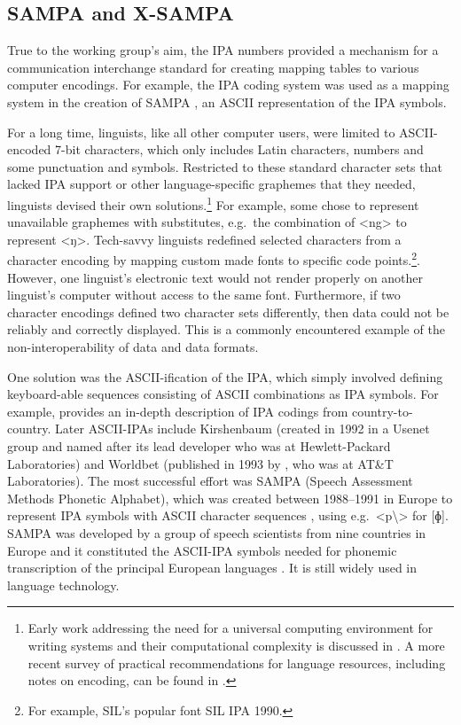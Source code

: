 \subsection*{SAMPA and X-SAMPA}
\label{sampa-xsampa}

True to the working group's aim, the IPA numbers provided a mechanism for 
a communication interchange standard for creating mapping tables to various 
computer encodings. For example, the IPA coding system was used as a mapping 
system in the creation of SAMPA \citep{Wells_etal1992}, an ASCII representation 
of the IPA symbols. 

For a long time, linguists, like all other computer users, were
limited to ASCII-encoded 7-bit characters, which only includes Latin characters,
numbers and some punctuation and symbols. Restricted to these standard character
sets that lacked IPA support or other language-specific graphemes that they
needed, linguists devised their own solutions.\footnote{Early work addressing
the need for a universal computing environment for writing systems and their
computational complexity is discussed in \citet{Simons1989}. A more recent survey of
practical recommendations for language resources, including notes on encoding,
can be found in \citet{BirdSimons2003}.} For example, some chose to represent
unavailable graphemes with substitutes, e.g.~the combination of <ng> to
represent <ŋ>. Tech-savvy linguists redefined selected characters from a
character encoding by mapping custom made fonts to specific code points.\footnote{For 
example, SIL's popular font SIL IPA 1990.}. However,
one linguist's electronic text would not render properly on another linguist's
computer without access to the same font. Furthermore, if two character encodings
defined two character sets differently, then data could not be reliably and
correctly displayed. This is a commonly encountered example of the non-interoperability of
data and data formats.

One solution was the ASCII-ification of the IPA, which simply involved 
defining keyboard-able sequences consisting of ASCII combinations as IPA symbols. 
For example, \cite{Wells1987} provides an in-depth description of IPA
codings from country-to-country. Later ASCII-IPAs include Kirshenbaum (created
in 1992 in a Usenet group and named after its lead developer who was at
Hewlett-Packard Laboratories) and Worldbet (published in 1993 by
\cite{Hieronymus1993}, who was at AT\&T Laboratories). 
The most successful effort was SAMPA (Speech Assessment
Methods Phonetic Alphabet), which was created between 1988--1991 in Europe to 
represent IPA symbols with ASCII
character sequences \citep{Wells1987,Wells_etal1992}, using e.g.\ <p\textbackslash> 
for [ɸ]. SAMPA was developed by a group of speech scientists from nine countries 
in Europe and it constituted the ASCII-IPA symbols needed for phonemic transcription 
of the principal European languages \citep{Wells1995}. It is still widely 
used in language technology.

